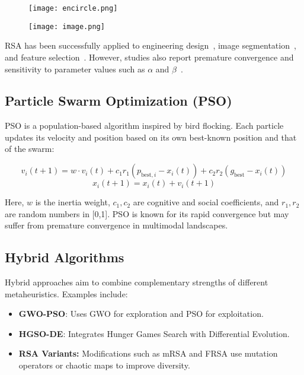 \documentclass[12pt]{article}
\begin{document}
\begin{figure}[H]
    \centering
    \texttt{[image: encircle.png]}
    \label{fig:rsa_flow}
\end{figure}
\begin{figure}[H]
    \centering
    \texttt{[image: image.png]}
    \label{fig:rsa_flow}
\end{figure}

RSA has been successfully applied to engineering design~\cite{emam2023modified}, image segmentation~\cite{yuan2022modified}, and feature selection~\cite{ervural2023binary}. However, studies also report premature convergence and sensitivity to parameter values such as \(\alpha\) and \(\beta\)~\cite{ma2024shifted}.

\subsection{Particle Swarm Optimization (PSO)}
PSO is a population-based algorithm inspired by bird flocking. Each particle updates its velocity and position based on its own best-known position and that of the swarm:

\begin{equation}
    v_i(t+1) = w \cdot v_i(t) + c_1 r_1 \left(p_{\text{best},i} - x_i(t)\right) + c_2 r_2 \left(g_{\text{best}} - x_i(t)\right)
\end{equation}
\begin{equation}
    x_i(t+1) = x_i(t) + v_i(t+1)
\end{equation}

Here, \(w\) is the inertia weight, \(c_1, c_2\) are cognitive and social coefficients, and \(r_1, r_2\) are random numbers in [0,1]. PSO is known for its rapid convergence but may suffer from premature convergence in multimodal landscapes.

\subsection{Hybrid Algorithms}
Hybrid approaches aim to combine complementary strengths of different metaheuristics. Examples include:
\begin{itemize}
    \item \textbf{GWO-PSO}: Uses GWO for exploration and PSO for exploitation.
    \item \textbf{HGSO-DE}: Integrates Hunger Games Search with Differential Evolution.
    \item \textbf{RSA Variants:} Modifications such as mRSA and FRSA use mutation operators or chaotic maps to improve diversity.
\end{itemize}
\end{document}
